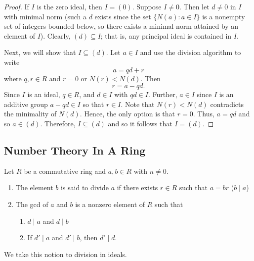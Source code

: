 \begin{proof}
If \( I  \) is the zero ideal, then \( I = (0) \). Suppose \( I \neq 0  \). Then let \( d \neq 0  \) in \( I  \) with minimal norm (such a \( d \) exists since the set \( \{ N(a) : a \in I  \}\) is a nonempty set of integers bounded below, so there exists a minimal norm attained by an element of \( I \)). Clearly, \( (d) \subseteq I  \); that is, any principal ideal is contained in \( I  \).  

Next, we will show that \( I \subseteq (d) \). Let \( a \in  I \) and use the division algorithm to write 
\[  a = qd + r    \]
where \( q,r \in R   \) and \( r = 0  \) or \( N(r) < N(d) \). Then
\[  r = a - qd. \]
Since \( I \) is an ideal, \( q \in R  \), and \( d \in I  \) with \( qd \in I  \). Further, \( a \in I  \) since \( I \) is an additive group \( a - qd \in I  \) so that \( r \in I   \). Note that \( N(r) < N(d) \) contradicts the minimality of \( N(d) \). Hence, the only option is that \( r = 0  \). Thus, \( a= qd  \) and so \( a \in (d) \). Therefore, \( I \subseteq (d)   \) and so it follows that \( I = (d) \).
\end{proof}

\subsection{Number Theory In A Ring}

\begin{definition}
    Let \( R  \) be a commutative ring and \( a,b \in R  \) with \( n \neq 0   \). 
    \begin{enumerate}
        \item[(1)] The element \( b  \) is said to divide \( a \) if there exists \( r \in R  \) such that \(a = br \) (\( b \mid a  \))
        \item[(2)] The gcd of \( a \) and \( b  \) is a nonzero element of \( R  \) such that   
            \begin{enumerate}
                \item[(i)] \( d \mid a  \) and \( d \mid b     \)
                \item[(ii)] If \( d' \mid a   \) and \( d' \mid b  \), then \( d' \mid d  \).
            \end{enumerate}
    \end{enumerate}
\end{definition}

We take this notion to division in ideals.  

